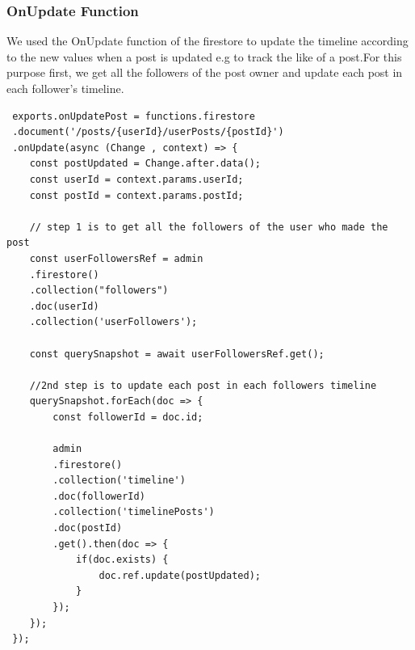 \subsubsection{OnUpdate Function}
We used the OnUpdate function of the firestore to update the timeline according to the new values when a post is updated e.g to track the like of a post.For this purpose first, we get all the followers of the post owner and update each post in each follower's timeline.

\begin{verbatim}
 exports.onUpdatePost = functions.firestore
 .document('/posts/{userId}/userPosts/{postId}')
 .onUpdate(async (Change , context) => {
    const postUpdated = Change.after.data();
    const userId = context.params.userId;
    const postId = context.params.postId;

    // step 1 is to get all the followers of the user who made the post
    const userFollowersRef = admin
    .firestore()
    .collection("followers")
    .doc(userId)
    .collection('userFollowers');

    const querySnapshot = await userFollowersRef.get();

    //2nd step is to update each post in each followers timeline
    querySnapshot.forEach(doc => {
        const followerId = doc.id;

        admin
        .firestore()
        .collection('timeline')
        .doc(followerId)
        .collection('timelinePosts')
        .doc(postId)
        .get().then(doc => {
            if(doc.exists) {
                doc.ref.update(postUpdated);
            }
        });
    });
 });
\end{verbatim}
